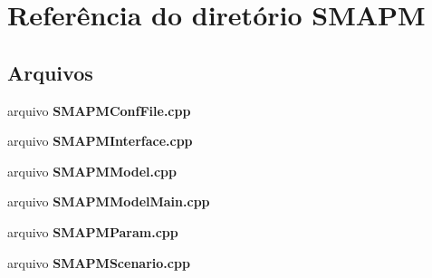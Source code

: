 \section{Referência do diretório S\+M\+A\+PM}
\label{dir_b69a3acc34b2461beb655fb203f39059}
\subsection*{Arquivos}
\begin{DoxyCompactItemize}
\item 
arquivo {\bf S\+M\+A\+P\+M\+Conf\+File.\+cpp}
\item 
arquivo {\bf S\+M\+A\+P\+M\+Interface.\+cpp}
\item 
arquivo {\bf S\+M\+A\+P\+M\+Model.\+cpp}
\item 
arquivo {\bf S\+M\+A\+P\+M\+Model\+Main.\+cpp}
\item 
arquivo {\bf S\+M\+A\+P\+M\+Param.\+cpp}
\item 
arquivo {\bf S\+M\+A\+P\+M\+Scenario.\+cpp}
\end{DoxyCompactItemize}
